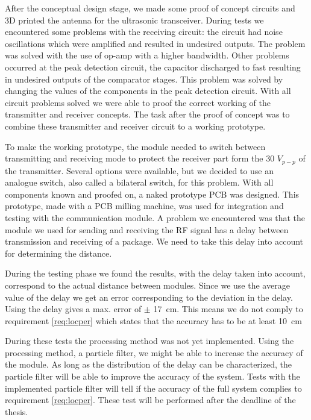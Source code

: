 After the conceptual design stage, we made some proof of concept circuits and 3D printed the antenna for the ultrasonic transceiver.
During tests we encountered some problems with the receiving circuit: the circuit had noise oscillations which were amplified and resulted in undesired outputs.
The problem was solved with the use of op-amp with a higher bandwidth.
Other problems occurred at the peak detection circuit, the capacitor discharged to fast resulting in undesired outputs of the comparator stages.
This problem was solved by changing the values of the components in the peak detection circuit.
With all circuit problems solved we were able to proof the correct working of the transmitter and receiver concepts.
The task after the proof of concept was to combine these transmitter and receiver circuit to a working prototype.

To make the working prototype, the module needed to switch between transmitting and receiving mode to protect the receiver part form the 30 $V_{p-p}$ of the transmitter.
Several options were available, but we decided to use an analogue switch, also called a bilateral switch, for this problem.
With all components known and proofed on, a naked prototype PCB was designed.
This prototype, made with a PCB milling machine, was used for integration and testing with the communication module.
A problem we encountered was that the module we used for sending and receiving the RF signal has a delay between transmission and receiving of a package.
We need to take this delay into account for determining the distance.

During the testing phase we found the results, with the delay taken into account, correspond to the actual distance between modules.
Since we use the average value of the delay we get an error corresponding to the deviation in the delay.
Using the delay gives a max. error of $\pm$ \SI{17}{\centi\meter}.
This means we do not comply to requirement \ref{req:locper} which states that the accuracy has to be at least \SI{10}{\centi\meter}

During these tests the processing method was not yet implemented.
Using the processing method, a particle filter, we might be able to increase the accuracy of the module.
As long as the distribution of the delay can be characterized, the particle filter will be able to improve the accuracy of the system.
Tests with the implemented particle filter will tell if the accuracy of the full system complies to requirement \ref{req:locper}.
These test will be performed after the deadline of the thesis.

